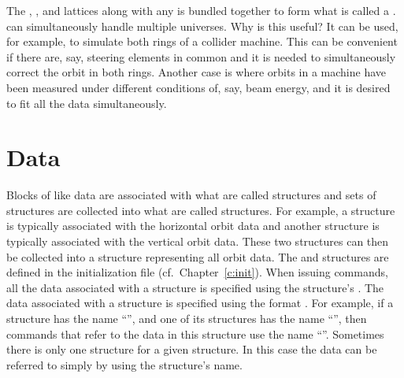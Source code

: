 The , , and  lattices along with any
 is bundled together to form what is called a
. \tao can simultaneously handle multiple universes. Why
is this useful? It can be used, for example, to simulate both rings of
a collider machine. This can be convenient if there are, say, steering
elements in common and it is needed to simultaneously correct the
orbit in both rings. Another case is where orbits in a machine have
been measured under different conditions of, say, beam energy, and it
is desired to fit all the data simultaneously.

\section{Data}

Blocks of like data are associated with what are called 
structures and sets of  structures are collected into what
are called  structures. For example, a 
structure is typically associated with the horizontal orbit data and
another  structure is typically associated with the
vertical orbit data. These two structures can then be collected into a
 structure representing all orbit data. The 
and  structures are defined in the \tao initialization
file (cf.~Chapter~\ref{c:init}).  When issuing \tao commands, all the
data associated with a  structure is specified using the
 structure's .  The data associated with a
 structure is specified using the format
. For example, if a  structure has the
name ``'', and one of its  structures has the
name ``'', then \tao commands that refer to the data in this
 structure use the name ``''. Sometimes there
is only one  structure for a given 
structure. In this case the data can be referred to simply by using
the  structure's name.

